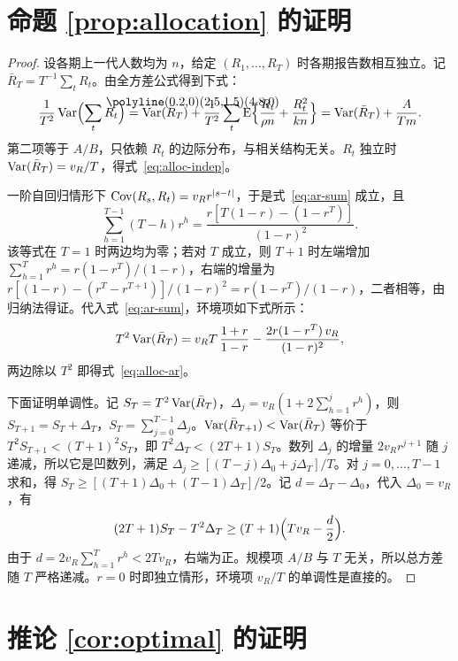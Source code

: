 \section{\texorpdfstring{命题 \ref{prop:allocation} 的证明}{命题 4.1 的证明}}
\label{app:allocation}

\begin{proof}
设各期上一代人数均为 $n$，给定 $(R_1,\dots,R_T)$ 时各期报告数相互独立。记 $\bar R_T=T^{-1}\sum_tR_t$。由全方差公式得到下式：
\begin{equation*}
  \frac{1}{T^2}\Var\Bigl(\sum_t\widehat R_t\Bigr)=\Var(\bar R_T)+\frac1{T^2}\sum_t\E\Bigl\{\frac{R_t}{\rho n}+\frac{R_t^2}{kn}\Bigr\}
  =\Var(\bar R_T)+\frac{A}{Tm}.
\end{equation*}
第二项等于 $A/B$，只依赖 $R_t$ 的边际分布，与相关结构无关。$R_t$ 独立时 $\operatorname{Var}(\bar R_T)=v_R/T$，得式~\eqref{eq:alloc-indep}。

一阶自回归情形下 $\operatorname{Cov}(R_s,R_t)=v_Rr^{|s-t|}$，于是式~\eqref{eq:ar-sum} 成立，且
\begin{equation*}
  \sum_{h=1}^{T-1}(T-h)r^h=\frac{r[T(1-r)-(1-r^T)]}{(1-r)^2}.
\end{equation*}
该等式在 $T=1$ 时两边均为零；若对 $T$ 成立，则 $T+1$ 时左端增加 $\sum_{h=1}^{T}r^h=r(1-r^T)/(1-r)$，右端的增量为 $r[(1-r)-(r^T-r^{T+1})]/(1-r)^2=r(1-r^T)/(1-r)$，二者相等，由归纳法得证。代入式~\eqref{eq:ar-sum}，环境项如下式所示：
\begin{equation*}
  T^2\operatorname{Var}(\bar R_T)=v_RT\,\frac{1+r}{1-r}-\frac{2r(1-r^T)\,v_R}{(1-r)^2},
\end{equation*}
两边除以 $T^2$ 即得式~\eqref{eq:alloc-ar}。

下面证明单调性。记 $S_T=T^2\operatorname{Var}(\bar R_T)$，$\Delta_j=v_R(1+2\sum_{h=1}^{j}r^h)$，则 $S_{T+1}=S_T+\Delta_T$，$S_T=\sum_{j=0}^{T-1}\Delta_j$。$\operatorname{Var}(\bar R_{T+1})<\operatorname{Var}(\bar R_T)$ 等价于 $T^2S_{T+1}<(T+1)^2S_T$，即 $T^2\Delta_T<(2T+1)S_T$。数列 $\Delta_j$ 的增量 $2v_Rr^{j+1}$ 随 $j$ 递减，所以它是凹数列，满足 $\Delta_j\geq[(T-j)\Delta_0+j\Delta_T]/T$。对 $j=0,\dots,T-1$ 求和，得 $S_T\geq[(T+1)\Delta_0+(T-1)\Delta_T]/2$。记 $d=\Delta_T-\Delta_0$，代入 $\Delta_0=v_R$，有
\begin{equation*}
  (2T+1)S_T-T^2\Delta_T\geq(T+1)\Bigl(Tv_R-\frac d2\Bigr).
\end{equation*}
由于 $d=2v_R\sum_{h=1}^{T}r^h<2Tv_R$，右端为正。规模项 $A/B$ 与 $T$ 无关，所以总方差随 $T$ 严格递减。$r=0$ 时即独立情形，环境项 $v_R/T$ 的单调性是直接的。
\end{proof}

\section{\texorpdfstring{推论 \ref{cor:optimal} 的证明}{推论 4.1 的证明}}
\label{app:optimal}

